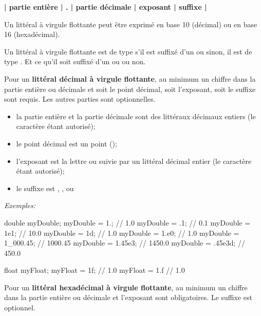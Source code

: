 \bigskip
\begin{center}
	\large\bf	| partie entière | . | partie décimale | exposant | suffixe |
\end{center}
\bigskip

Un littéral à virgule flottante peut être exprimé en base 10 (décimal) ou en 
base 16 (hexadécimal). 

Un littéral à virgule flottante est de type  s'il est suffixé d'un
 ou  sinon, il est de type . Et ce qu'il soit suffixé
d'un  ou  ou non. 

Pour un \textbf{littéral décimal à virgule flottante}, au minimum un chiffre
dans la partie entière ou décimale et soit le point décimal, soit l'exposant,
soit le suffixe sont requis. Les autres parties sont optionnelles. 

\begin{itemize}

	\item la partie entière et la partie décimale sont des littéraux décimaux
		entiers (le caractère \pc{\_} étant autorisé);

	\item le point décimal est un point ();

	\item l'exposant est la lettre  ou  suivie par un littéral
		décimal entier (le caractère \pc{\_} étant autorisé);

	\item le suffixe est , ,  ou 

\end{itemize}

\textit{Exemples:}
\begin{java}
	double myDouble;
	myDouble = 1.;			// 1.0
	myDouble = .1;			// 0.1
	myDouble = 1e1;			// 10.0
	myDouble = 1d;			// 1.0
	myDouble = 1.e0;		// 1.0
	myDouble = 1_000.45;	// 1000.45
	myDouble = 1.45e3;		// 1450.0
	myDouble = .45e3d;		// 450.0
	
	float myFloat;
	myFloat = 1f;			// 1.0
	myFloat = 1.f			// 1.0	
\end{java}

Pour un \textbf{littéral hexadécimal à virgule flottante}, au minimum un
chiffre dans la partie entière ou décimale et l'exposant sont obligatoires. Le
suffixe est optionnel. 

